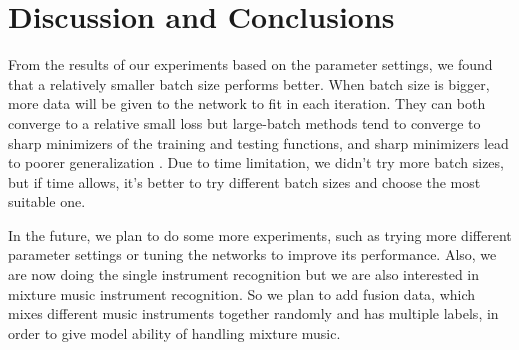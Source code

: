 \documentclass{article}
\begin{document}




\section{Discussion and Conclusions}

From the results of our experiments based on the parameter settings, we found that a relatively smaller batch size performs better. When batch size is bigger, more data will be given to the network to fit in each iteration. They can both converge to a relative small loss but large-batch methods tend to converge to sharp minimizers of the training and testing functions, and sharp minimizers lead to poorer generalization \cite{keskar}. Due to time limitation, we didn't try more batch sizes, but if time allows, it's better to try different batch sizes and choose the most suitable one.


\noindent In the future, we plan to do some more experiments, such as trying more different parameter settings or tuning the networks to improve its performance. Also, we are now doing the single instrument recognition but we are also interested in mixture music instrument recognition. So we plan to add fusion data, which mixes different music instruments together randomly and has multiple labels, in order to give model ability of handling mixture music.
\end{document}
